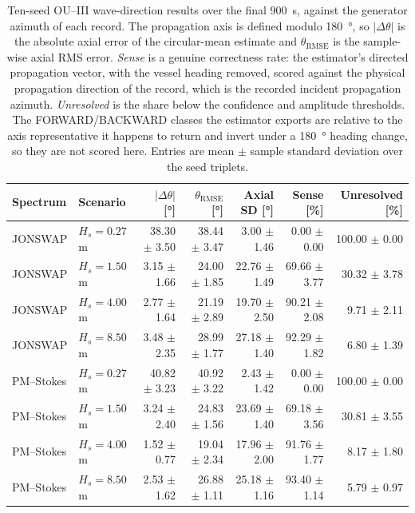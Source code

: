 \begin{table}[t]
  \centering
  \caption{Ten-seed OU--III wave-direction results over the final \SI{900}{s}, against the generator azimuth of each record. The propagation axis is defined modulo \SI{180}{\degree}, so $|\Delta\theta|$ is the absolute axial error of the circular-mean estimate and $\theta_{\mathrm{RMSE}}$ is the sample-wise axial RMS error. \emph{Sense} is a genuine correctness rate: the estimator's directed propagation vector, with the vessel heading removed, scored against the physical propagation direction of the record, which is the recorded incident propagation azimuth. \emph{Unresolved} is the share below the confidence and amplitude thresholds. The FORWARD/BACKWARD classes the estimator exports are relative to the axis representative it happens to return and invert under a \SI{180}{\degree} heading change, so they are not scored here. Entries are mean $\pm$ sample standard deviation over the seed triplets.}
  \label{tab:ou_mc_direction}
  \footnotesize
  \setlength{\tabcolsep}{3.6pt}
  \begin{tabular}{@{}llrrrrr@{}}
    \toprule
    Spectrum & Scenario & $|\Delta\theta|$ [\si{\degree}] & $\theta_{\mathrm{RMSE}}$ [\si{\degree}] & Axial SD [\si{\degree}] & Sense [\%] & Unresolved [\%] \\
    \midrule
    JONSWAP & $H_s=0.27$ m & 38.30 $\pm$ 3.50 & 38.44 $\pm$ 3.47 & 3.00 $\pm$ 1.46 & 0.00 $\pm$ 0.00 & 100.00 $\pm$ 0.00 \\
    JONSWAP & $H_s=1.50$ m & 3.15 $\pm$ 1.66 & 24.00 $\pm$ 1.85 & 22.76 $\pm$ 1.49 & 69.66 $\pm$ 3.77 & 30.32 $\pm$ 3.78 \\
    JONSWAP & $H_s=4.00$ m & 2.77 $\pm$ 1.64 & 21.19 $\pm$ 2.89 & 19.70 $\pm$ 2.50 & 90.21 $\pm$ 2.08 & 9.71 $\pm$ 2.11 \\
    JONSWAP & $H_s=8.50$ m & 3.48 $\pm$ 2.35 & 28.99 $\pm$ 1.77 & 27.18 $\pm$ 1.40 & 92.29 $\pm$ 1.82 & 6.80 $\pm$ 1.39 \\
    PM--Stokes & $H_s=0.27$ m & 40.82 $\pm$ 3.23 & 40.92 $\pm$ 3.22 & 2.43 $\pm$ 1.42 & 0.00 $\pm$ 0.00 & 100.00 $\pm$ 0.00 \\
    PM--Stokes & $H_s=1.50$ m & 3.24 $\pm$ 2.40 & 24.83 $\pm$ 1.56 & 23.69 $\pm$ 1.40 & 69.18 $\pm$ 3.56 & 30.81 $\pm$ 3.55 \\
    PM--Stokes & $H_s=4.00$ m & 1.52 $\pm$ 0.77 & 19.04 $\pm$ 2.34 & 17.96 $\pm$ 2.00 & 91.76 $\pm$ 1.77 & 8.17 $\pm$ 1.80 \\
    PM--Stokes & $H_s=8.50$ m & 2.53 $\pm$ 1.62 & 26.88 $\pm$ 1.11 & 25.18 $\pm$ 1.16 & 93.40 $\pm$ 1.14 & 5.79 $\pm$ 0.97 \\
    \bottomrule
  \end{tabular}
\end{table}

